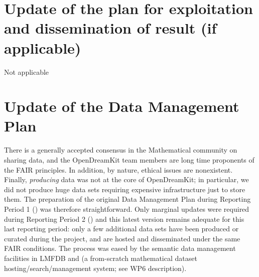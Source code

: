 
\section{Update of the plan for exploitation and dissemination of result (if
    applicable)}
 Not applicable

\section{Update of the Data Management Plan}


There is a generally accepted consensus in the Mathematical community
on sharing data, and the OpenDreamKit team members are long time
proponents of the FAIR principles. In addition, by nature, ethical
issues are nonexistent. Finally, \emph{producing} data was not at the
core of OpenDreamKit; in particular, we did not produce huge data sets
requiring expensive infrastructure just to store them. The preparation
of the original Data Management Plan during Reporting Period 1
() was therefore straightforward.
Only marginal updates were required during Reporting Period 2
() and this latest version
remains adequate for this last reporting period: only a few additional
data sets have been produced or curated during the project, and are
hosted and disseminated under the same FAIR conditions. The process
was eased by the semantic data management facilities in LMFDB and \dmh
(a from-scratch mathematical dataset hosting/search/management system;
see WP6 description).



